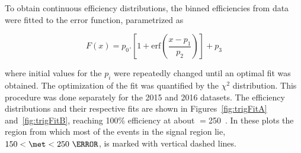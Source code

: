\par To obtain continuous efficiency distributions, the binned efficiencies from data were
 fitted to the error function, parametrized as 

\begin{equation}
F(x) = p_0.\left [ 1 + \text{erf}\left ( \frac{x-p_1}{p_2}\right )\right ] + p_3
\end{equation}

where initial values for the $p_i$ were repeatedly changed until an optimal 
fit was obtained. The optimization of the fit was quantified by the $\chi^2$ distribution. 
This procedure was done separately for the 2015 and 2016 datasets. The efficiency 
distributions and their respective fits are shown in Figures~\ref{fig:trigFitA} and~\ref{fig:trigFitB}, 
reaching 100\% efficiency at about \met$=$250~\GeV. In these plots the region from which most of the 
events in the signal region lie, $150<\met<250~\GeV$, is marked with vertical dashed lines.  
 
